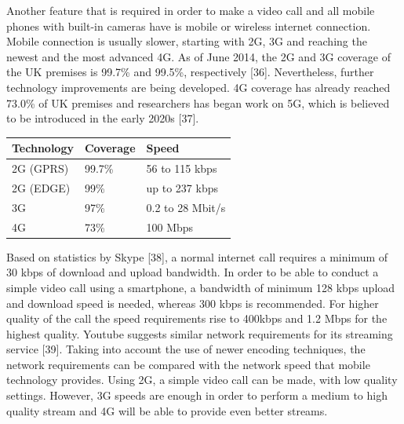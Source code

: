 \documentclass[]{article}
\begin{document}
    	Another feature that is required in order to make a video call and all mobile phones with built-in cameras have is mobile or wireless internet connection. Mobile connection is usually slower, starting with 2G, 3G and reaching the newest and the most advanced 4G. As of June 2014, the 2G and 3G coverage of the UK premises is 99.7\% and 99.5\%, respectively [36]. Nevertheless, further technology improvements are being developed. 4G coverage has already reached 73.0\% of UK premises and researchers has began work on 5G, which is believed to be introduced in the early 2020s [37].\\
\begin{table}[h]
\centering
\begin{tabular}{|l|l|l|}
\hline
\textbf{Technology} & \textbf{Coverage} & \textbf{Speed}   \\ \hline
2G (GPRS)           & 99.7\%            & 56 to 115 kbps   \\ \hline
2G (EDGE)           & 99\%              & up to 237 kbps   \\ \hline
3G                  & 97\%              & 0.2 to 28 Mbit/s \\ \hline
4G                  & 73\%              & 100 Mbps         \\ \hline
\end{tabular}
\end{table}
    	Based on statistics by Skype [38], a normal internet call requires a minimum of 30 kbps of download and upload bandwidth. In order to be able to conduct a simple video call using a smartphone, a bandwidth of minimum 128 kbps upload and download speed is needed, whereas 300 kbps is recommended. For higher quality of the call the speed requirements rise to 400kbps and 1.2 Mbps for the highest quality. Youtube suggests similar network requirements for its streaming service [39]. Taking into account the use of newer encoding techniques, the network requirements can be compared with the network speed that mobile technology provides. Using 2G, a simple video call can be made, with low quality settings. However, 3G speeds are enough in order to perform a medium to high quality stream and 4G will be able to provide even better streams.\\
    	
\end{document}
